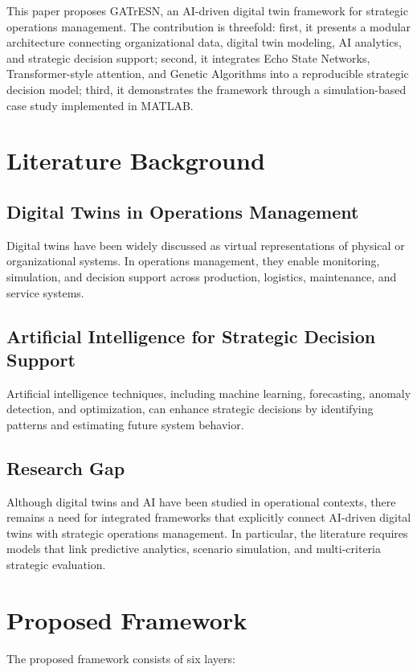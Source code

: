 \documentclass[11pt,a4paper]{article}
\begin{document}
This paper proposes GATrESN, an AI-driven digital twin framework for strategic operations management. The contribution is threefold: first, it presents a modular architecture connecting organizational data, digital twin modeling, AI analytics, and strategic decision support; second, it integrates Echo State Networks, Transformer-style attention, and Genetic Algorithms into a reproducible strategic decision model; third, it demonstrates the framework through a simulation-based case study implemented in MATLAB.

\section{Literature Background}
\subsection{Digital Twins in Operations Management}
Digital twins have been widely discussed as virtual representations of physical or organizational systems. In operations management, they enable monitoring, simulation, and decision support across production, logistics, maintenance, and service systems.

\subsection{Artificial Intelligence for Strategic Decision Support}
Artificial intelligence techniques, including machine learning, forecasting, anomaly detection, and optimization, can enhance strategic decisions by identifying patterns and estimating future system behavior.

\subsection{Research Gap}
Although digital twins and AI have been studied in operational contexts, there remains a need for integrated frameworks that explicitly connect AI-driven digital twins with strategic operations management. In particular, the literature requires models that link predictive analytics, scenario simulation, and multi-criteria strategic evaluation.

\section{Proposed Framework}
The proposed framework consists of six layers:
\end{document}
